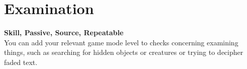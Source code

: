 \section{Examination}\label{sec:examination}
\textbf{Skill, Passive, Source, Repeatable}\\
You can add your relevant game mode level to checks concerning examining things, such as searching for hidden objects or creatures or trying to decipher faded text.